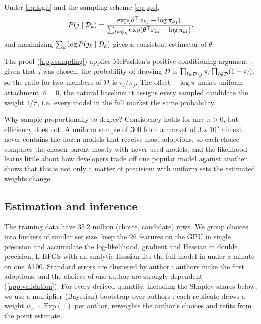 \begin{proposition}
\label{prop:pps}
Under \eqref{eq:logit} and the sampling scheme \eqref{eq:pps},
\begin{equation}
  P(j \mid \mathcal{D}_k) = \frac{\exp(\theta^\top x_{kj} - \log \pi_{kj})}{\sum_{l \in \mathcal{D}_k} \exp(\theta^\top x_{kl} - \log
  \pi_{kl})},
  \label{eq:corrected}
\end{equation}
and maximizing $\sum_k \log P(j_k \mid \mathcal{D}_k)$ gives a consistent estimator of $\theta$.
\end{proposition}
The proof (\cref{app:sampling}) applies McFadden's positive-conditioning argument \citep{mcfadden1978modelling}:
given that $j$ was chosen, the probability of drawing $\mathcal{D}$ is $\prod_{l \in \mathcal{D} \setminus j} \pi_l
\prod_{l \notin \mathcal{D}}(1-\pi_l)$, so the ratio for two members of $\mathcal{D}$ is $\pi_l / \pi_j$. The offset $-\log \pi$
makes uniform attachment, $\theta = 0$, the natural baseline: it assigns every sampled candidate the weight
$1/\pi$, i.e.\ every model in the full market the same probability.

Why sample proportionally to degree? Consistency holds for any $\pi > 0$, but efficiency does not. A uniform sample
of 300 from a market of $3 \times 10^5$ almost never contains the dozen models that receive most adoptions, so each
choice compares the chosen parent mostly with never-used models, and the likelihood learns little about how
developers trade off one popular model against another.  shows that this is not only a matter of
precision: with uniform sets the estimated weights change.

\subsection{Estimation and inference}
The training data have 35.2 million (choice, candidate) rows. We group choices into buckets of similar set size,
keep the 26 features on the GPU in single precision and accumulate the log-likelihood, gradient and Hessian in double
precision; L-BFGS with an analytic Hessian fits the full model in under a minute on one A100. Standard errors are
clustered by author \citep{cameron2015practitioner}: \nFirstAuthors{} authors make the \nFirst{} first adoptions, and
the choices of one author are strongly dependent (\cref{app:validation}). For every derived quantity, including the
Shapley shares below, we use a multiplier (Bayesian) bootstrap over authors \citep{rubin1981bayesian}: each
replicate draws a weight $w_a \sim \mathrm{Exp}(1)$ per author, reweights the author's choices and refits from the
point estimate.

